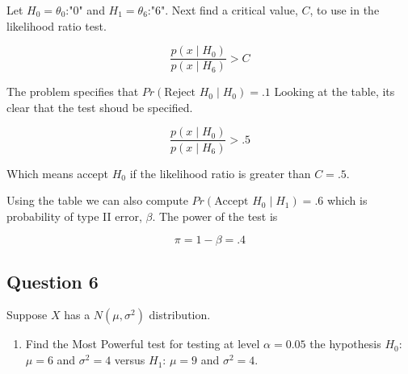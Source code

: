 \documentclass{tufte-book}
\theoremstyle{mytheoremstyle}
\theoremstyle{mylemstyle}
\theoremstyle{mydefstyle}
\begin{document}
\begin{table}
\end{table}

Let $H_0=\theta_0$:"$0$" and $H_1=\theta_6$:"$6$".  Next find a critical value, $C$, to use in the likelihood ratio test.

\[ \frac{p(x\mid H_0)}{p(x\mid H_6)} > C \]

The problem specifies that $Pr(\text{Reject }H_0 \mid H_0)=.1$  Looking at the table, its clear that the test shoud be specified.

\[ \frac{p(x\mid H_0)}{p(x\mid H_6)} > .5 \]

Which means accept $H_0$ if the likelihood ratio is greater than   $C=.5$.

Using the table we can also compute $Pr(\text{Accept }H_0 \mid H_1) = .6$ which is probability of type II error, $\beta$.  The power of the test is

\[ \pi = 1- \beta = .4 \]


\subsection{Question 6}
Suppose $X$ has a $N(\mu, \sigma^2)$ distribution.
\begin{enumerate}
\item Find the Most Powerful test for testing at level $\alpha=0.05$ the hypothesis $H_0$:$\mu = 6$ and $\sigma^2=4$ versus $H_1$: $\mu=9$ and $\sigma^2=4$.

\end{enumerate}
\end{document}
